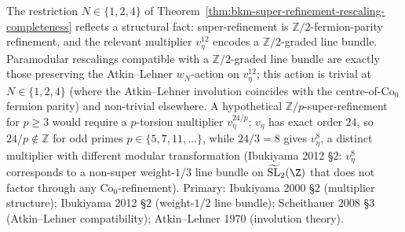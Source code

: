 \begin{remark}
\label{rem:bkm-rescaling-why-2-torsion}
The restriction $N\in\{1,2,4\}$ of
Theorem~\ref{thm:bkm-super-refinement-rescaling-completeness}
reflects a structural fact: super-refinement is
$\mathbb{Z}/2$-fermion-parity refinement, and the relevant
multiplier $v_\eta^{12}$ encodes a $\mathbb{Z}/2$-graded line
bundle. Paramodular rescalings compatible with a
$\mathbb{Z}/2$-graded line bundle are exactly those preserving the
Atkin--Lehner $w_N$-action on $v_\eta^{12}$; this action is
trivial at $N\in\{1,2,4\}$ (where the Atkin--Lehner involution
coincides with the centre-of-$\mathrm{Co}_0$ fermion parity) and
non-trivial elsewhere. A hypothetical
$\mathbb{Z}/p$-super-refinement for $p\ge 3$ would require a
$p$-torsion multiplier $v_\eta^{24/p}$; $v_\eta$ has exact order
$24$, so $24/p\notin\mathbb{Z}$ for odd primes
$p\in\{5,7,11,\ldots\}$, while $24/3 = 8$ gives $v_\eta^8$,
a distinct multiplier with different modular transformation
(Ibukiyama 2012 \S$2$: $v_\eta^8$ corresponds to a non-super
weight-$1/3$ line bundle on $\widetilde{\mathrm{SL}}_2(\Z)$ that
does not factor through any $\mathrm{Co}_0$-refinement).
Primary: Ibukiyama 2000 \S$2$ (multiplier structure);
Ibukiyama 2012 \S$2$ (weight-$1/2$ line bundle);
Scheithauer 2008 \S$3$ (Atkin--Lehner compatibility);
Atkin--Lehner 1970 (involution theory).
\end{remark}

